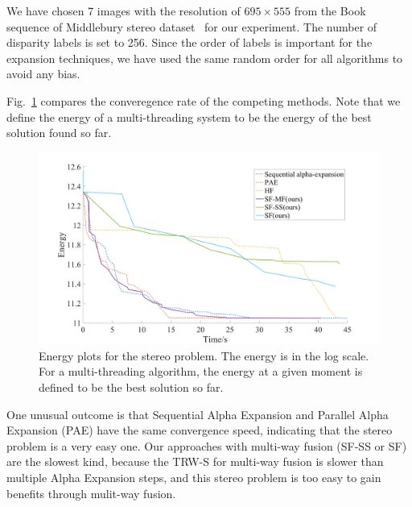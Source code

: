 
\noindent We have chosen 7 images with the resolution of $695\times555$
from the Book sequence of Middlebury stereo dataset~\cite{middlebury_stereo} for our
experiment. The number of disparity labels is
set to 256.
%
Since the order of labels is important for the expansion techniques,
we have used the same random order for all algorithms to avoid any
bias.
%



Fig.~\ref{fig:stereo_global} compares the converegence rate of the
competing methods. Note that we define the energy of a multi-threading
system to be the energy of the best solution found so far.
%
\begin{figure}[tb]
  \includegraphics[width=\columnwidth]{figure/stereo_global.png}
 \caption{Energy plots for the stereo problem. The energy is in the log
 scale. For a multi-threading algorithm, the energy at a given moment is
 defined to be the best solution so far.} \label{fig:stereo_global}
\end{figure}
%
One unusual outcome is that Sequential Alpha Expansion and Parallel
Alpha Expansion (PAE) have the same convergence speed, indicating that
the stereo problem is a very easy one.
Our approaches with multi-way fusion (SF-SS or SF) are the slowest kind,
because the TRW-S for multi-way fusion is slower than multiple Alpha
Expansion steps, and this stereo problem is too easy to gain benefits
through mulit-way fusion.
%
